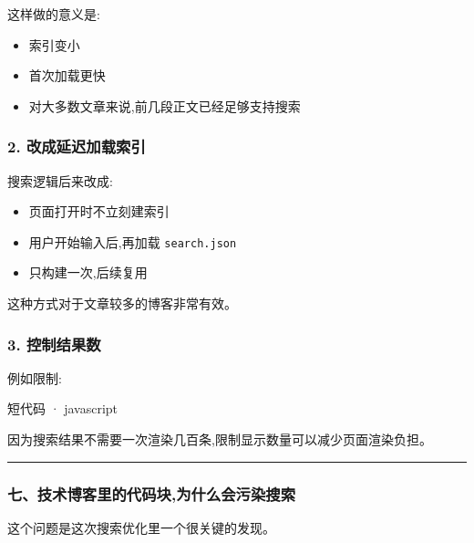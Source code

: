 \documentclass[lang=cn,scheme=chinese,color=blue,device=normal,toc=onecol,math=cm]{elegantbook}
\begin{document}
这样做的意义是:\par


\begin{itemize}
\item 索引变小
\item 首次加载更快
\item 对大多数文章来说,前几段正文已经足够支持搜索
\end{itemize}


\subsubsection{2. 改成延迟加载索引}


搜索逻辑后来改成:\par


\begin{itemize}
\item 页面打开时不立刻建索引
\item 用户开始输入后,再加载 \texttt{search.json}
\item 只构建一次,后续复用
\end{itemize}


这种方式对于文章较多的博客非常有效。\par


\subsubsection{3. 控制结果数}


例如限制:\par


\begin{inlinecodebox}{短代码 · javascript}
\end{inlinecodebox}


因为搜索结果不需要一次渲染几百条,限制显示数量可以减少页面渲染负担。\par


\medskip\hrule\medskip


\subsubsection{七、技术博客里的代码块,为什么会污染搜索}


这个问题是这次搜索优化里一个很关键的发现。\par
\end{document}
